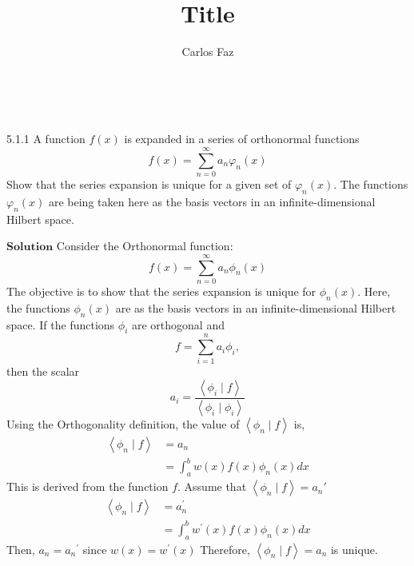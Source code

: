\documentclass{article}
\title{Title}
\author{Carlos Faz}
\date{ \ }
\begin{document}
\begin{flushleft}



\begin{mybox}{5.1.1}
A function $f(x)$ is expanded in a series of orthonormal functions
$$
f(x)=\sum_{n=0}^{\infty} a_{n} \varphi_{n}(x)
$$
Show that the series expansion is unique for a given set of $\varphi_{n}(x) .$ The functions $\varphi_{n}(x)$ are being taken here as the basis vectors in an infinite-dimensional Hilbert space.
\end{mybox}

$\boxed{\textbf{Solution}}$ Consider the Orthonormal function:
$$
f(x)=\sum_{n=0}^{\infty} a_{n} \phi_{n}(x)
$$
The objective is to show that the series expansion is unique for $\phi_{n}(x)$.
Here, the functions $\phi_{n}(x)$ are as the basis vectors in an infinite-dimensional Hilbert space.
If the functions $\phi_{i}$ are orthogonal and $$f=\sum_{i=1}^{n} a_{i} \phi_{i},$$ then the scalar $$a_{i}=\frac{\left\langle\phi_{i} \mid f\right\rangle}{\left\langle\phi_{i} \mid \phi_{i}\right\rangle}$$
Using the Orthogonality definition, the value of $\left\langle\phi_{n} \mid f\right\rangle$ is,
$$
\begin{aligned}
\left\langle\phi_{n} \mid f\right\rangle &=a_{n} \\
&=\int_{a}^{b} w(x) f(x) \phi_{n}(x) d x
\end{aligned}
$$
This is derived from the function $f$.
Assume that $\left\langle\phi_{n} \mid f\right\rangle=a_{n}'$
$$
\begin{aligned}
\left\langle\phi_{n} \mid f\right\rangle &=a_{n}^{\prime} \\
&=\int_{a}^{b} w^{\prime}(x) f(x) \phi_{n}(x) d x
\end{aligned}
$$
Then, $a_{n}=a_{n}{ }^{\prime}$ since $w(x)=w^{\prime}(x)$ Therefore, $\left\langle\phi_{n} \mid f\right\rangle=a_{n}$ is unique.


\newpage


\end{flushleft}
\end{document}
